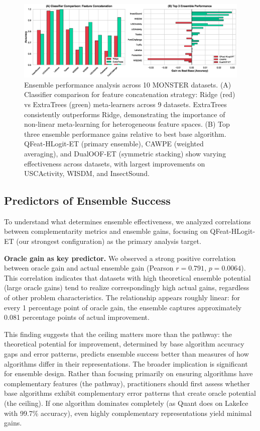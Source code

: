 \documentclass[pdflatex,sn-basic]{sn-jnl}           %
\theoremstyle{thmstyleone}%
\theoremstyle{thmstyletwo}%
\theoremstyle{thmstylethree}%
\begin{document}
\begin{figure}[t]
\centering
\includegraphics[width=\textwidth]{figure2_ensemble_performance}
\caption{Ensemble performance analysis across 10 MONSTER datasets. (A) Classifier comparison for feature concatenation strategy: Ridge (red) vs ExtraTrees (green) meta-learners across 9 datasets. ExtraTrees consistently outperforms Ridge, demonstrating the importance of non-linear meta-learning for heterogeneous feature spaces. (B) Top three ensemble performance gains relative to best base algorithm. QFeat-HLogit-ET (primary ensemble), CAWPE (weighted averaging), and DualOOF-ET (symmetric stacking) show varying effectiveness across datasets, with largest improvements on USCActivity, WISDM, and InsectSound.}\label{fig:ensemble}
\end{figure}

\subsection{Predictors of Ensemble Success}\label{subsec:predictors}

To understand what determines ensemble effectiveness, we analyzed correlations between complementarity metrics and ensemble gains, focusing on QFeat-HLogit-ET (our strongest configuration) as the primary analysis target.

\textbf{Oracle gain as key predictor.} We observed a strong positive correlation between oracle gain and actual ensemble gain (Pearson $r=0.791$, $p=0.0064$). This correlation indicates that datasets with high theoretical ensemble potential (large oracle gains) tend to realize correspondingly high actual gains, regardless of other problem characteristics. The relationship appears roughly linear: for every 1 percentage point of oracle gain, the ensemble captures approximately 0.081 percentage points of actual improvement.

This finding suggests that the ceiling matters more than the pathway: the theoretical potential for improvement, determined by base algorithm accuracy gaps and error patterns, predicts ensemble success better than measures of how algorithms differ in their representations. The broader implication is significant for ensemble design. Rather than focusing primarily on ensuring algorithms have complementary features (the pathway), practitioners should first assess whether base algorithms exhibit complementary error patterns that create oracle potential (the ceiling). If one algorithm dominates completely (as Quant does on LakeIce with 99.7\% accuracy), even highly complementary representations yield minimal gains.
\end{document}
